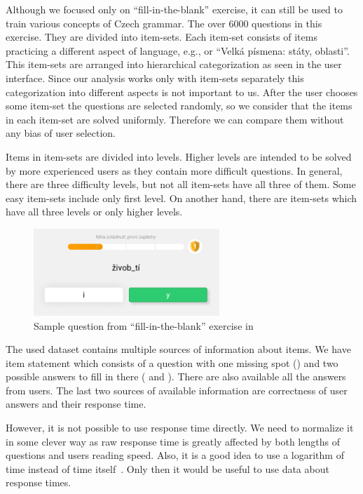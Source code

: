 \documentclass[
  print, %
  table,   %
  nolof,     %
  nolot,     %
  nocover,
  color,
  final,
]{fithesis3}
\begin{document}
Although we focused only on ``fill-in-the-blank'' exercise, it can still be used to train various concepts of Czech grammar. The over 6000 questions in this exercise. They are divided into item-sets. Each item-set consists of items practicing a different aspect of language, e.g., \cviceniB{} or ``Velká písmena: státy, oblasti''. This item-sets are arranged into hierarchical categorization as seen in the user interface. Since our analysis works only with item-sets separately this categorization into different aspects is not important to us. After the user chooses some item-set the questions are selected randomly, so we consider that the items in each item-set are solved uniformly. Therefore we can compare them without any bias of user selection.

Items in item-sets are divided into levels. Higher levels are intended to be solved by more experienced users as they contain more difficult questions. In general, there are three difficulty levels, but not all item-sets have all three of them. Some easy item-sets include only first level. On another hand, there are item-sets which have all three levels or only higher levels.

\begin{figure}
  \includegraphics[width=7cm]{img/umimecesky_doplnovacka}
  \caption{Sample question from ``fill-in-the-blank'' exercise in \umimeCesky{}}
  \label{fig:umimecesky_doplnovacka}
\end{figure}


The used dataset contains multiple sources of information about items. We have item statement which consists of a question with one missing spot () and two possible answers to fill in there ( and ). There are also available all the answers from users. The last two sources of available information are correctness of user answers and their response time.

However, it is not possible to use response time directly. We need to normalize it in some clever way as raw response time is greatly affected by both lengths of questions and users reading speed. Also, it is a good idea to use a logarithm of time instead of time itself~\cite{niznan2014using}. Only then it would be useful to use data about response times.
\end{document}
